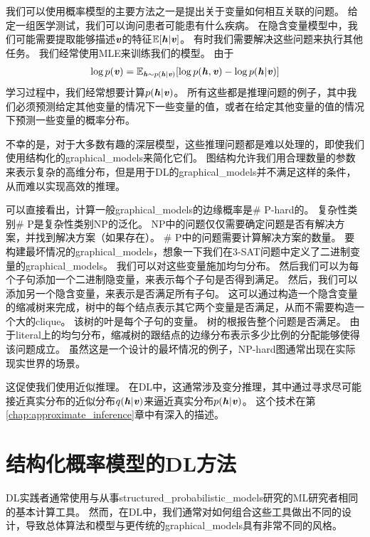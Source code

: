 我们可以使用概率模型的主要方法之一是提出关于变量如何相互关联的问题。 
给定一组医学测试，我们可以询问患者可能患有什么疾病。
在隐含变量模型中，我们可能需要提取能够描述$\boldsymbol{\mathit{v}}$的特征$\mathbb{E}[\boldsymbol{\mathit{h}}\vert\boldsymbol{\mathit{v}}]$。
有时我们需要解决这些问题来执行其他任务。 
我们经常使用\gls{MLE}来训练我们的模型。
由于
\begin{align}
\label{eqn:169}
\log p(\boldsymbol{\mathit{v}}) = \mathbb{E}_{\boldsymbol{\mathit{h}} \sim p(\boldsymbol{\mathit{h}}\vert \boldsymbol{\mathit{v}})} [\log p(\boldsymbol{\mathit{h}},\boldsymbol{\mathit{v}}) -  \log p(\boldsymbol{\mathit{h}}\vert\boldsymbol{\mathit{v}})]
\end{align}
学习过程中，我们经常想要计算$p(\boldsymbol{\mathit{h}}\vert\boldsymbol{\mathit{v}})$。
所有这些都是推理问题的例子，其中我们必须预测给定其他变量的情况下一些变量的值，或者在给定其他变量的值的情况下预测一些变量的概率分布。

不幸的是，对于大多数有趣的深层模型，这些推理问题都是难以处理的，即使我们使用结构化的\gls{graphical_models}来简化它们。
图结构允许我们用合理数量的参数来表示复杂的高维分布，但是用于\gls{DL}的\gls{graphical_models}并不满足这样的条件，从而难以实现高效的推理。


可以直接看出，计算一般\gls{graphical_models}的边缘概率是\# P-hard的。
复杂性类别\# P是复杂性类别NP的泛化。
NP中的问题仅仅需要确定问题是否有解决方案，并找到解决方案（如果存在）。
\# P中的问题需要计算解决方案的数量。
要构建最坏情况的\gls{graphical_models}，想象一下我们在3-SAT问题中定义了二进制变量的\gls{graphical_models}。
我们可以对这些变量施加均匀分布。
然后我们可以为每个子句添加一个二进制隐变量，来表示每个子句是否得到满足。
然后，我们可以添加另一个隐含变量，来表示是否满足所有子句。
这可以通过构造一个隐含变量的缩减树来完成，树中的每个结点表示其它两个变量是否满足，从而不需要构造一个大的\gls{clique}。
该树的叶是每个子句的变量。
树的根报告整个问题是否满足。
由于literal上的均匀分布，缩减树的跟结点的边缘分布表示多少比例的分配能够使得该问题成立。
虽然这是一个设计的最坏情况的例子，NP-hard图通常出现在实际现实世界的场景。


这促使我们使用近似推理。
在\gls{DL}中，这通常涉及变分推理，其中通过寻求尽可能接近真实分布的近似分布$q(\boldsymbol{\mathit{h}}\vert\boldsymbol{\mathit{v}})$来逼近真实分布$p(\boldsymbol{\mathit{h}}\vert\boldsymbol{\mathit{v}})$。
这个技术在第\ref{chap:approximate_inference}章中有深入的描述。



\section{结构化概率模型的\gls{DL}方法}
\label{sec:the_deep_learning_approach_to_structured_probabilistic_models}

\gls{DL}实践者通常使用与从事\gls{structured_probabilistic_models}研究的\gls{ML}研究者相同的基本计算工具。
然而，在\gls{DL}中，我们通常对如何组合这些工具做出不同的设计，导致总体算法和模型与更传统的\gls{graphical_models}具有非常不同的风格。


